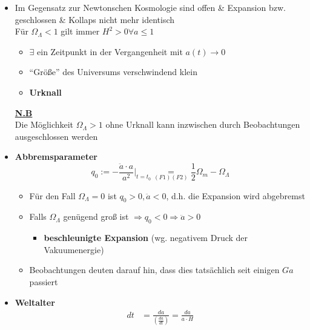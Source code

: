 \begin{itemize}
\begin{itemize}
\begin{figure}[H]
				\end{figure}
		\end{itemize}
	\item Im Gegensatz zur Newtonschen Kosmologie sind offen \& Expansion bzw. geschlossen \& Kollaps nicht mehr identisch\\
		Für $\Omega_\Lambda < 1$ gilt immer $H^2>0\forall a\leq 1$
		\begin{itemize}
			\item $\exists$ ein Zeitpunkt in der Vergangenheit mit $a(t)\to 0$
			\item "`Größe"' des Universums verschwindend klein
			\item \textbf{Urknall}
		\end{itemize}
		\textbf{\underline{N.B}}\\
		Die Möglichkeit $\Omega_\Lambda >1$ ohne Urknall kann inzwischen durch Beobachtungen ausgeschlossen werden
	\item \textbf{Abbremsparameter}
		\begin{equation*}
			q_0:=-\frac{\ddot{a}\cdot a}{a^2}\big|_{t=t_0}\underset{(F1)(F2)}{=}\frac{1}{2}\Omega_m-\Omega_\Lambda
		\end{equation*}
		\begin{itemize}[label={\textbullet}]
			\item Für den Fall $\Omega_\Lambda=0$ ist $q_0>0,\ddot{a}<0$, d.h. die Expansion wird abgebremst
			\item Falls $\Omega_\Lambda$ genügend groß ist $\Rightarrow q_0<0\Rightarrow \ddot{a}>0$
				\begin{itemize}[label={$\Rightarrow$}]
					\item \textbf{beschleunigte Expansion} (wg. negativem Druck der Vakuumenergie)
				\end{itemize}
			\item Beobachtungen deuten darauf hin, dass dies tatsächlich seit einigen $\si{Ga}$ passiert
		\end{itemize}
	\item \textbf{Weltalter}
		\begin{align*}
			dt&=\frac{da}{\left(\frac{da}{dt}\right)}=\frac{da}{a\cdot H}\\

\end{align*}
\end{itemize}
